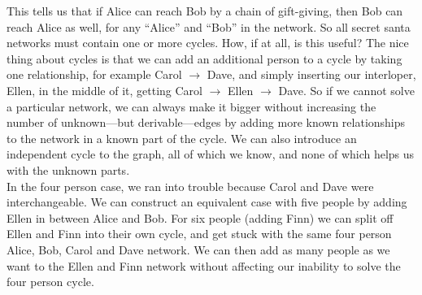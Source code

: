 \documentclass{article}
\begin{document}
This tells us that if Alice can reach Bob by a chain of gift-giving, then Bob can reach Alice as well, for any ``Alice'' and ``Bob'' in the network. So all secret santa networks must contain one or more cycles. How, if at all, is this useful? The nice thing about cycles is that we can add an additional person to a cycle by taking one relationship, for example Carol $\rightarrow$ Dave, and simply inserting our interloper, Ellen, in the middle of it, getting Carol $\rightarrow$ Ellen $\rightarrow$ Dave. So if we cannot solve a particular network, we can always make it bigger without increasing the number of unknown---but derivable---edges by adding more known relationships to the network in a known part of the cycle. We can also introduce an independent cycle to the graph, all of which we know, and none of which helps us with the unknown parts.\\

In the four person case, we ran into trouble because Carol and Dave were interchangeable. We can construct an equivalent case with five people by adding Ellen in between Alice and Bob. For six people (adding Finn) we can split off Ellen and Finn into their own cycle, and get stuck with the same four person Alice, Bob, Carol and Dave network. We can then add as many people as we want to the Ellen and Finn network without affecting our inability to solve the four person cycle.\\
\end{document}
